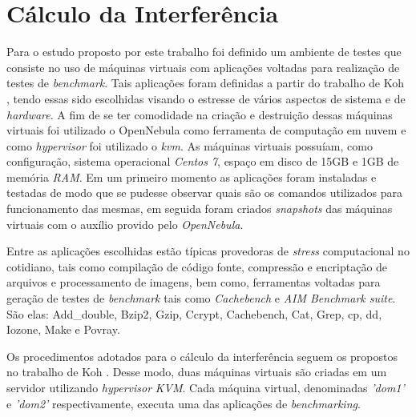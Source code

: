 \section{Cálculo da Interferência}
\label{sec:calculo-interferencia}

Para o estudo proposto por este trabalho foi definido um  ambiente de testes
que consiste no uso de máquinas virtuais com aplicações voltadas para
realização de testes de \textit{benchmark}. Tais aplicações foram definidas a
partir do trabalho de Koh \cite{koh2007}, tendo essas sido escolhidas visando o
estresse de vários aspectos de sistema e de \textit{hardware}. A fim de se ter
comodidade na criação e destruição dessas máquinas virtuais foi utilizado o
OpenNebula como ferramenta de computação em nuvem e como \textit{hypervisor}
foi utilizado o \textit{kvm}. As máquinas virtuais possuíam, como configuração,
sistema operacional \textit{Centos 7}, espaço em disco de 15GB e 1GB de memória
\textit{RAM}. Em um primeiro momento as aplicações foram instaladas e testadas
de modo que se pudesse observar quais são os comandos utilizados para
funcionamento das mesmas, em seguida foram criados \textit{snapshots} das
máquinas virtuais com o auxílio provido pelo \textit{OpenNebula}.

Entre as aplicações escolhidas estão típicas provedoras de \textit{stress}
computacional no cotidiano, tais como compilação de código fonte, compressão e
encriptação de arquivos e processamento de imagens, bem como, ferramentas
voltadas para geração de testes de \textit{benchmark} tais como
\textit{Cachebench} e \textit{AIM Benchmark suite}. São elas: Add\_double,
Bzip2, Gzip, Ccrypt, Cachebench, Cat, Grep, cp, dd, Iozone, Make e Povray.


Os procedimentos adotados para o cálculo da interferência seguem os propostos
no trabalho de Koh \cite{koh2007}. Desse modo, duas máquinas virtuais são
criadas em um servidor utilizando \textit{hypervisor} \textit{KVM}. Cada
máquina virtual, denominadas \textit{'dom1'} e \textit{'dom2'} respectivamente,
executa uma das aplicações de \textit{benchmarking}. 

